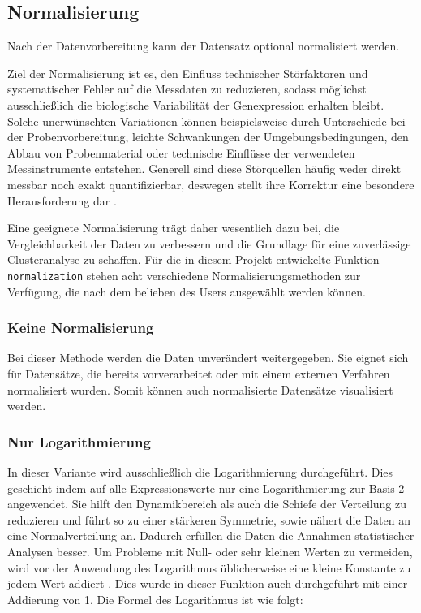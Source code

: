 \documentclass[12pt]{article}
\begin{document}
\subsection{Normalisierung}
\label{normalisierung}

Nach der Datenvorbereitung kann der Datensatz optional normalisiert werden. 

Ziel der Normalisierung ist es, den Einfluss technischer Störfaktoren und systematischer Fehler auf die Messdaten zu reduzieren, sodass möglichst ausschließlich die biologische Variabilität der Genexpression erhalten bleibt. Solche unerwünschten Variationen können beispielsweise durch Unterschiede bei der Probenvorbereitung, leichte Schwankungen der Umgebungsbedingungen, den Abbau von Probenmaterial oder technische Einflüsse der verwendeten Messinstrumente entstehen. Generell sind diese Störquellen häufig weder direkt messbar noch exakt quantifizierbar, deswegen stellt ihre Korrektur eine besondere Herausforderung dar \cite{Dubois2022}. 

Eine geeignete Normalisierung trägt daher wesentlich dazu bei, die Vergleichbarkeit der Daten zu verbessern und die Grundlage für eine zuverlässige Clusteranalyse zu schaffen. Für die in diesem Projekt entwickelte Funktion \texttt{normalization} stehen acht verschiedene Normalisierungsmethoden zur Verfügung, die nach dem belieben des Users ausgewählt werden können.

\subsubsection{Keine Normalisierung}
\label{Keine Normalisierung}

Bei dieser Methode werden die Daten unverändert weitergegeben. Sie eignet sich für Datensätze, die bereits vorverarbeitet oder mit einem externen Verfahren normalisiert wurden. Somit können auch normalisierte Datensätze visualisiert werden.

\subsubsection{Nur Logarithmierung}
\label{Nur Logarithmierung}

In dieser Variante wird ausschließlich die Logarithmierung durchgeführt.
Dies geschieht indem auf alle Expressionswerte nur eine Logarithmierung zur Basis 2 angewendet. Sie hilft den Dynamikbereich als auch die Schiefe der Verteilung zu reduzieren und führt so zu einer stärkeren Symmetrie, sowie nähert die Daten an eine Normalverteilung an. Dadurch erfüllen die Daten die Annahmen statistischer Analysen besser. Um Probleme mit Null- oder sehr kleinen Werten zu vermeiden, wird vor der Anwendung des Logarithmus üblicherweise eine kleine Konstante zu jedem Wert addiert \cite{Deng2025}. Dies wurde in dieser Funktion auch durchgeführt mit einer Addierung von 1. Die Formel des Logarithmus ist wie folgt:
\end{document}
